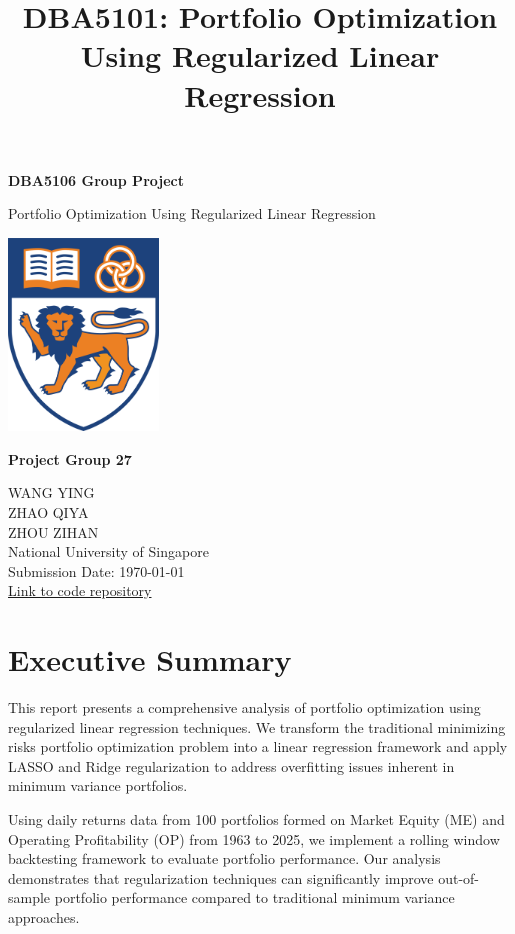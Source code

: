 \documentclass[12pt]{article}
\title{DBA5101: Portfolio Optimization Using Regularized Linear Regression}
\author{}
\date{}
\begin{document}
\begin{titlepage}
    \centering
    \vspace*{1cm}
    {\Huge\bfseries DBA5106 Group Project\\[0.5em]}
    {\Huge Portfolio Optimization Using Regularized Linear Regression \par}
    \vspace{1cm}
    \includegraphics[width=0.30\textwidth]{nus_logo.png} \\[2em]
    {\large \textbf{Project Group 27}\par}
    \vspace{0.5cm}
    {\small
    WANG YING \\[0.2em]
    ZHAO QIYA \\[0.2em]
    ZHOU ZIHAN \\[0.2em]
    }
    \vspace{1cm}
    {\large
    National University of Singapore \\
    \vspace{0.5cm}
    Submission Date: \today \\
    \vspace{0.3cm}
    \href{https://github.com/ying-jeanne/fundation_ba}{Link to code repository}
    }
    \vfill
\end{titlepage}

\newpage

\section{Executive Summary}

This report presents a comprehensive analysis of portfolio optimization using regularized linear regression techniques. We transform the traditional minimizing risks portfolio optimization problem into a linear regression framework and apply LASSO and Ridge regularization to address overfitting issues inherent in minimum variance portfolios.

Using daily returns data from 100 portfolios formed on Market Equity (ME) and Operating Profitability (OP) from 1963 to 2025, we implement a rolling window backtesting framework to evaluate portfolio performance. Our analysis demonstrates that regularization techniques can significantly improve out-of-sample portfolio performance compared to traditional minimum variance approaches.
\end{document}
